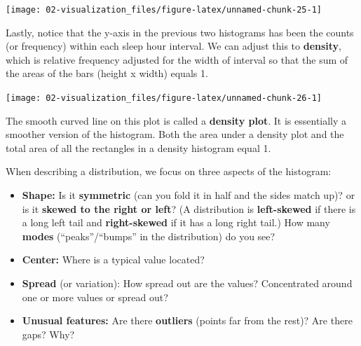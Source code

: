 \documentclass[
]{book}
\newenvironment{Shaded}{\begin{snugshade}}{\end{snugshade}}
\newcommand{\DataTypeTok}[1]{\textcolor[rgb]{0.13,0.29,0.53}{#1}}
\newcommand{\DecValTok}[1]{\textcolor[rgb]{0.00,0.00,0.81}{#1}}
\newcommand{\FloatTok}[1]{\textcolor[rgb]{0.00,0.00,0.81}{#1}}
\newcommand{\KeywordTok}[1]{\textcolor[rgb]{0.13,0.29,0.53}{\textbf{#1}}}
\newcommand{\NormalTok}[1]{#1}
\newcommand{\OperatorTok}[1]{\textcolor[rgb]{0.81,0.36,0.00}{\textbf{#1}}}
\newcommand{\StringTok}[1]{\textcolor[rgb]{0.31,0.60,0.02}{#1}}
\providecommand{\tightlist}{%
  \setlength{\itemsep}{0pt}\setlength{\parskip}{0pt}}
\begin{document}
\begin{center}\texttt{[image: 02-visualization\_files/figure-latex/unnamed-chunk-25-1]} \end{center}

Lastly, notice that the y-axis in the previous two histograms has been the counts (or frequency) within each sleep hour interval. We can adjust this to \textbf{density}, which is relative frequency adjusted for the width of interval so that the sum of the areas of the bars (height x width) equals 1.

\begin{Shaded}
\end{Shaded}

\begin{center}\texttt{[image: 02-visualization\_files/figure-latex/unnamed-chunk-26-1]} \end{center}

The smooth curved line on this plot is called a \textbf{density plot}. It is essentially a smoother version of the histogram. Both the area under a density plot and the total area of all the rectangles in a density histogram equal 1.

When describing a distribution, we focus on three aspects of the histogram:

\begin{itemize}
\tightlist
\item
  \textbf{Shape:} Is it \textbf{symmetric} (can you fold it in half and the sides match up)? or is it \textbf{skewed to the right or left}? (A distribution is \textbf{left-skewed} if there is a long left tail and \textbf{right-skewed} if it has a long right tail.) How many \textbf{modes} (``peaks''/``bumps'' in the distribution) do you see?
\item
  \textbf{Center:} Where is a typical value located?
\item
  \textbf{Spread} (or variation): How spread out are the values? Concentrated around one or more values or spread out?
\item
  \textbf{Unusual features:} Are there \textbf{outliers} (points far from the rest)? Are there gaps? Why?
\end{itemize}
\end{document}
